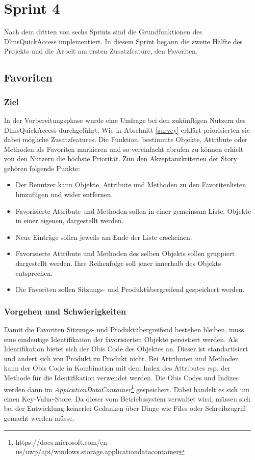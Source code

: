 \section{Sprint 4}\label{sprint4}
Nach dem dritten von sechs Sprints sind die Grundfunktionen des DlmsQuickAccess implementiert.
In diesem Sprint begann die zweite Hälfte des Projekts und die Arbeit am ersten Zusatzfeature, den Favoriten.


\subsection{Favoriten}

\subsubsection{Ziel}
In der Vorbereitungsphase wurde eine Umfrage bei den zukünftigen Nutzern des DlmsQuickAccess durchgeführt.
Wie in Abschnitt \ref{survey} erklärt priorisierten sie dabei mögliche Zusatzfeatures.
Die Funktion, bestimmte Objekte, Attribute oder Methoden als Favoriten markieren und so vereinfacht abrufen zu können erhielt von den Nutzern die höchste Priorität.
Zun den Akzeptanzkriterien der Story gehören folgende Punkte:
\begin{itemize}
   \item Der Benutzer kann Objekte, Attribute und Methoden zu den Favoritenlisten hinzufügen und wider entfernen.
   \item Favorisierte Attribute und Methoden sollen in einer gemeinsam Liste, Objekte in einer eigenen, dargestellt werden.
   \item Neue Einträge sollen jeweils am Ende der Liste erscheinen.
   \item Favorisierte Attribute und Methoden des selben Objekts sollen gruppiert dargestellt werden. Ihre Reihenfolge soll jener innerhalb des Objekts entsprechen.
   \item Die Favoriten sollen Sitzungs- und Produktübergreifend gespeichert werden.
\end{itemize}


\subsubsection{Vorgehen und Schwierigkeiten}
Damit die Favoriten  Sitzungs- und Produktübergreifend bestehen bleiben, muss eine eindeutige Identifikation der favorisierten Objekte persistiert werden.
Als Identifikation bietet sich der Obis Code des Objektes an.
Dieser ist standartisiert und ändert sich von Produkt zu Produkt nicht.
Bei Attributen und Methoden kann der Obis Code in Kombination mit dem Index des Attributes rsp. der Methode für die Identifikation verwendet werden.
Die Obis Codes und Indizes werden dann im \textit{AppicationDataContainer}\footnote{https://docs.microsoft.com/en-us/uwp/api/windows.storage.applicationdatacontainer} gespeichert.
Dabei handelt es sich um einen Key-Value-Store.
Da dieser vom Betriebssystem verwaltet wird, müssen sich bei der Entwicklung keinerlei Gedanken über Dinge wie Files oder Schreibzugriff gemacht werden müsse.

